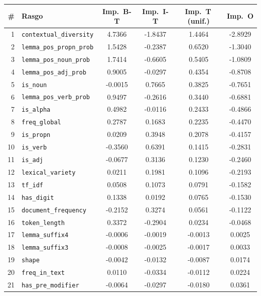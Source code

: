 \begin{table}[ht]
\centering
\small
\begin{tabular}{@{} r l c c c c @{}}
\toprule
\# & \textbf{Rasgo} & \textbf{Imp.\ B-T} & \textbf{Imp.\ I-T} & \textbf{Imp.\ T\,(unif.)} & \textbf{Imp.\ O} \\
\midrule
1 & \texttt{contextual\_diversity} & 4.7366 & -1.8437 & 1.4464 & -2.8929 \\
2 & \texttt{lemma\_pos\_propn\_prob} & 1.5428 & -0.2387 & 0.6520 & -1.3040 \\
3 & \texttt{lemma\_pos\_noun\_prob} & 1.7414 & -0.6605 & 0.5405 & -1.0809 \\
4 & \texttt{lemma\_pos\_adj\_prob} & 0.9005 & -0.0297 & 0.4354 & -0.8708 \\
5 & \texttt{is\_noun} & -0.0015 & 0.7665 & 0.3825 & -0.7651 \\
6 & \texttt{lemma\_pos\_verb\_prob} & 0.9497 & -0.2616 & 0.3440 & -0.6881 \\
7 & \texttt{is\_alpha} & 0.4982 & -0.0116 & 0.2433 & -0.4866 \\
8 & \texttt{freq\_global} & 0.2787 & 0.1683 & 0.2235 & -0.4470 \\
9 & \texttt{is\_propn} & 0.0209 & 0.3948 & 0.2078 & -0.4157 \\
10 & \texttt{is\_verb} & -0.3560 & 0.6391 & 0.1415 & -0.2831 \\
11 & \texttt{is\_adj} & -0.0677 & 0.3136 & 0.1230 & -0.2460 \\
12 & \texttt{lexical\_variety} & 0.0211 & 0.1981 & 0.1096 & -0.2193 \\
13 & \texttt{tf\_idf} & 0.0508 & 0.1073 & 0.0791 & -0.1582 \\
14 & \texttt{has\_digit} & 0.1338 & 0.0192 & 0.0765 & -0.1530 \\
15 & \texttt{document\_frequency} & -0.2152 & 0.3274 & 0.0561 & -0.1122 \\
16 & \texttt{token\_length} & 0.3372 & -0.2904 & 0.0234 & -0.0468 \\
17 & \texttt{lemma\_suffix4} & -0.0006 & -0.0019 & -0.0013 & 0.0025 \\
18 & \texttt{lemma\_suffix3} & -0.0008 & -0.0025 & -0.0017 & 0.0033 \\
19 & \texttt{shape} & -0.0042 & -0.0132 & -0.0087 & 0.0174 \\
20 & \texttt{freq\_in\_text} & 0.0110 & -0.0334 & -0.0112 & 0.0224 \\
21 & \texttt{has\_pre\_modifier} & -0.0064 & -0.0297 & -0.0180 & 0.0361 \\

\end{tabular}
\end{table}
